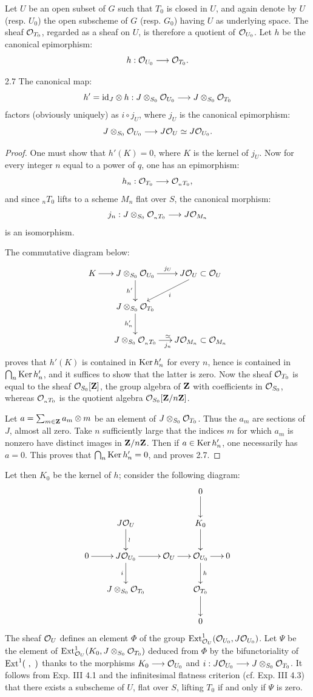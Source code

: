 Let $U$ be an open subset of $G$ such that $T_0$ is closed in $U$, and again denote by $U$ (resp. $U_0$) the open subscheme of $G$ (resp. $G_0$) having $U$ as underlying space. The sheaf $\mathcal{O}_{T_0}$, regarded as a sheaf on $U$, is therefore a quotient of $\mathcal{O}_{U_0}$. Let $h$ be the canonical epimorphism:
\[
h:\mathcal{O}_{U_0}\longrightarrow\mathcal{O}_{T_0}.
\]
\begin{lemma}{2.7}\label{XV.2.7}
The canonical map:
\[
h'=\mathrm{id}_J\otimes h:J\otimes_{S_0}\mathcal{O}_{U_0}\longrightarrow J\otimes_{S_0}\mathcal{O}_{T_0}
\]
factors (obviously uniquely) as $i\circ j_U$, where $j_U$ is the canonical epimorphism:
\[
J\otimes_{S_0}\mathcal{O}_{U_0}\longrightarrow J\mathcal{O}_U\simeq J\mathcal{O}_{U_0}.
\]
\end{lemma}
\begin{proof}
One must show that $h'(K)=0$, where $K$ is the kernel of $j_U$. Now for every integer $n$ equal to a power of $q$, one has an epimorphism:
\[
h_n:\mathcal{O}_{T_0}\longrightarrow\mathcal{O}_{{}_nT_0},
\]
and since ${}_nT_0$ lifts to a scheme $M_n$ flat over $S$, the canonical morphism:
\[
j_n:J\otimes_{S_0}\mathcal{O}_{{}_nT_0}\longrightarrow J\mathcal{O}_{M_n}
\]
is an isomorphism.

The commutative diagram below:
\[
\xymatrix@C=15pt{
K\ar[r]&J\otimes_{S_0}\OO_{U_0}\ar[r]^{j_U}\ar[d]_{h'}&J\OO_U\subset\OO_U\ar[dl]^{i}\\
&J\otimes_{S_0}\OO_{T_0}\ar[d]_{h'_n}&\\
&J\otimes_{S_0}\OO_{{}_nT_0}\ar[r]_{j_n}^{\simeq}&J\OO_{M_n}\subset\OO_{M_n}
}
\]
proves that $h'(K)$ is contained in $\operatorname{Ker} h'_n$ for every $n$, hence is contained in $\bigcap_n\operatorname{Ker} h'_n$, and it suffices to show that the latter is zero. Now the sheaf $\mathcal{O}_{T_0}$ is equal to the sheaf $\mathcal{O}_{S_0}[\mathbf{Z}]$, the group algebra of $\mathbf{Z}$ with coefficients in $\mathcal{O}_{S_0}$, whereas $\mathcal{O}_{{}_nT_0}$ is the quotient algebra $\mathcal{O}_{S_0}[\mathbf{Z}/n\mathbf{Z}]$.

Let $a=\sum_{m\in\mathbf{Z}}a_m\otimes m$ be an element of $J\otimes_{S_0}\mathcal{O}_{T_0}$. Thus the $a_m$ are sections of $J$, almost all zero. Take $n$ sufficiently large that the indices $m$ for which $a_m$ is nonzero have distinct images in $\mathbf{Z}/n\mathbf{Z}$. Then if $a\in\operatorname{Ker} h'_n$, one necessarily has $a=0$. This proves that $\bigcap_n\operatorname{Ker} h'_n=0$, and proves 2.7.
\end{proof}

Let then $K_0$ be the kernel of $h$; consider the following diagram:
\[
\xymatrix@C=15pt{
&&&0\ar[d]&\\
&J\OO_U\ar[d]^{\wr}&&K_0\ar[d]&\\
0\ar[r]&J\OO_{U_0}\ar[r]\ar[d]_{i}&\OO_U\ar[r]&\OO_{U_0}\ar[r]\ar[d]^{h}&0\\
&J\otimes_{S_0}\OO_{T_0}&&\OO_{T_0}\ar[d]&\\
&&&0&
}
\]
The sheaf $\mathcal{O}_U$ defines an element $\Phi$ of the group $\operatorname{Ext}^1_{\mathcal{O}_U}(\mathcal{O}_{U_0},J\mathcal{O}_{U_0})$. Let $\Psi$ be the element of $\operatorname{Ext}^1_{\mathcal{O}_U}(K_0,J\otimes_{S_0}\mathcal{O}_{T_0})$ deduced from $\Phi$ by the bifunctoriality of $\Ext^1(\ ,\ )$ thanks to the morphisms $K_0\longrightarrow\mathcal{O}_{U_0}$ and $i:J\mathcal{O}_{U_0}\longrightarrow J\otimes_{S_0}\mathcal{O}_{T_0}$. It follows from Exp. III 4.1 and the infinitesimal flatness criterion (cf. Exp. III 4.3) that there exists a subscheme of $U$, flat over $S$, lifting $T_0$ if and only if $\Psi$ is zero.

